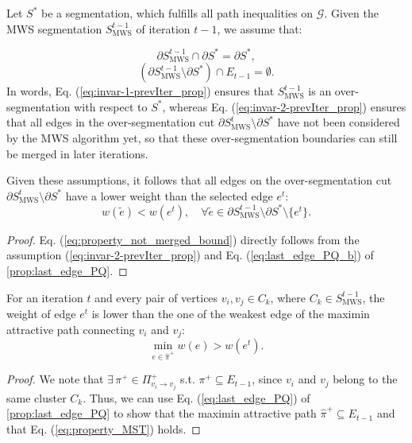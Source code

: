 \begin{proposition} \label{coroll-MST-1}
Let 
$S^{*}$ be a segmentation, which fulfills all path inequalities on $\mathcal{G}$. Given the MWS segmentation $S_{\mathrm{MWS}}^{t-1}$ of iteration $t-1$, we assume that:

\begin{equation}
\partial S_{\mathrm{MWS}}^{t-1}\cap\partial S^{*}=\partial S^{*}, \label{eq:invar-1-prevIter_prop}
\end{equation}
\begin{equation}
 \left(\partial S_{\mathrm{MWS}}^{t-1}\setminus\partial S^{*}\right)\cap E_{t-1}=\emptyset. \label{eq:invar-2-prevIter_prop}
 \end{equation}
In words, Eq. (\ref{eq:invar-1-prevIter_prop}) ensures that $S_{\mathrm{MWS}}^{t-1}$
is an over-segmentation with respect to $S^{*}$, whereas Eq. (\ref{eq:invar-2-prevIter_prop})
ensures that all edges in the over-segmentation cut ${\partial S_{\mathrm{MWS}}^{t}\setminus\partial S^{*}}$ have not been considered by the MWS algorithm yet, so that these over-segmentation boundaries can still be merged in later iterations. 

Given these assumptions, it follows that all edges on the over-segmentation cut ${\partial S_{\mathrm{MWS}}^{t}\setminus\partial S^{*}}$ have a lower weight than the selected edge $e^t$:
\begin{equation}
w(\tilde{e}) < w(e^{t}),\quad\forall\tilde{e}\in\partial S_{\mathrm{MWS}}^{t-1}\setminus\partial S^{*} \setminus \{e^t\}. \label{eq:property_not_merged_bound}
\end{equation}
\end{proposition}
\begin{proof} Eq. (\ref{eq:property_not_merged_bound}) directly follows from the assumption (\ref{eq:invar-2-prevIter_prop}) and Eq. (\ref{eq:last_edge_PQ_b}) of \autoref{prop:last_edge_PQ}. 
\end{proof}

\begin{proposition}
\label{coroll-MST-2}For an iteration $t$ and every pair of vertices
$v_{i},v_{j}\in C_{k}$, where $C_{k}\in S_{\mathrm{MWS}}^{t-1}$, the weight of edge $e^{t}$ is lower than the one of the
weakest edge of the maximin attractive path connecting $v_{i}$ and
$v_{j}$:
\begin{equation}
\min_{e\in\hat{\pi}^{+}}w(e)>w(e^{t}).\label{eq:property_MST}
\end{equation}
\end{proposition}
\begin{proof} We note that $\exists \, \pi^+\in \Pi_{v_{i}\rightarrow v_{j}}^{+}$ s.t. $\pi^+ \subseteq E_{t-1}$, since $v_{i}$ and $v_{j}$ belong to the same cluster $C_{k}$. Thus, we can use Eq. (\ref{eq:last_edge_PQ}) of \autoref{prop:last_edge_PQ} to show that the maximin attractive path $\hat{\pi}^+\subseteq E_{t-1}$ and that Eq. (\ref{eq:property_MST}) holds.
\end{proof}



